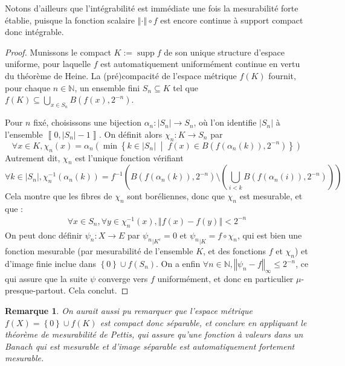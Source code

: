 \documentclass[a4paper,12pt]{article}
\newtheorem{remark}[theorem]{Remarque}
\newcommand{\N}{\mathbb{N}}
\newcommand{\norm}[1]{\left\Vert #1\right\Vert}
\newcommand{\abs}[1]{\left\vert#1\right\vert}
\newcommand{\card}[1]{\abs{#1}}
\newcommand{\set}[1]{\left\{ #1 \right\}}
\newcommand{\tq}{\;\middle|\;}
\newcommand{\inv}{^{-1}}
\newcommand{\compl}{^c}
\newcommand{\comp}{\circ}
\DeclareMathOperator{\Supp}{supp}
\begin{document}
Notons d'ailleurs que l'intégrabilité est immédiate une fois la mesurabilité forte établie, 
puisque la fonction scalaire $\norm{\cdot}\comp f$ est encore continue à support compact donc intégrable.

\begin{proof}
    Munissons le compact $K:=\Supp f$ de son unique structure d'espace uniforme, pour laquelle $f$ est automatiquement 
    uniformément continue en vertu du théorème de Heine. La (pré)compacité de l'espace métrique $f(K)$ fournit, 
    pour chaque $n\in\N$, un ensemble fini $S_n\subseteq K$ tel que $f(K)\subseteq\bigcup_{x\in S_n}B(f(x), 2^{-n})$.

    Pour $n$ fixé, choisissons une bijection $\alpha_n : \card{S_n} \to S_n$, où l'on identifie $\card{S_n}$ à l'ensemble 
    $\left\llbracket0, \card{S_n}-1\right\rrbracket$. On définit alors $\chi_n:K\to S_n$ par
    \begin{equation*}
        \forall x\in K, \chi_n(x)=\alpha_n\left(\min\set{k\in\card{S_n}\tq f(x)\in B(f(\alpha_n(k)), 2^{-n})}\right)
    \end{equation*}
    Autrement dit, $\chi_n$ est l'unique fonction vérifiant 
    \begin{equation*}
        \forall k\in\card{S_n}, \chi_n\inv(\alpha_n(k)) = f\inv\left(B(f(\alpha_n(k)), 2^{-n})\setminus\left(\bigcup_{i<k}B(f(\alpha_n(i)), 2^{-n})\right)\right)
    \end{equation*}
    Cela montre que les fibres de $\chi_n$ sont boréliennes, donc que $\chi_n$ est mesurable, et que :
    \begin{align*}
        \forall x\in S_n, \forall y\in\chi_n\inv(x), \norm{f(x)-f(y)}<2^{-n}
    \end{align*}
    On peut donc définir $\psi_n : X\to E$ par ${\psi_n}_{|K\compl}=0$ et ${\psi_n}_{|K}=f\comp\chi_n$, qui est bien une fonction 
    mesurable (par mesurabilité de l'ensemble $K$, et des fonctions $f$ et $\chi_n$) et d'image finie 
    inclue dans $\set{0}\cup f(S_n)$. On a enfin 
    $\forall n\in\N, \norm{\psi_n - f}_\infty \le 2^{-n}$, ce qui assure que la suite $\psi$ converge vers $f$ uniformément, 
    et donc en particulier $\mu$-presque-partout. Cela conclut.
\end{proof}

\begin{remark}
    On aurait aussi pu remarquer que l'espace métrique $f(X) = \set{0}\cup f(K)$ est compact donc séparable,
    et conclure en appliquant le théorème de mesurabilité de Pettis, qui assure qu'une fonction à valeurs dans un Banach 
    qui est mesurable et d'image séparable est automatiquement fortement mesurable.
\end{remark}
\end{document}
